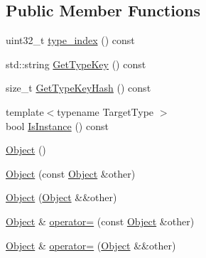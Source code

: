 \subsection*{Public Member Functions}
\begin{DoxyCompactItemize}
\item 
uint32\+\_\+t \hyperlink{classtvm_1_1runtime_1_1Object_a594c0d786dbc567ff6774ab11b45958a}{type\+\_\+index} () const 
\item 
std\+::string \hyperlink{classtvm_1_1runtime_1_1Object_a9581610ea91e0e38f57edc82e264a1b0}{Get\+Type\+Key} () const 
\item 
size\+\_\+t \hyperlink{classtvm_1_1runtime_1_1Object_ac9a7d8d3d562803c9cf91271c462b61d}{Get\+Type\+Key\+Hash} () const 
\item 
{\footnotesize template$<$typename Target\+Type $>$ }\\bool \hyperlink{classtvm_1_1runtime_1_1Object_af1359ebff2c328ff0bb80083937c95dd}{Is\+Instance} () const 
\item 
\hyperlink{classtvm_1_1runtime_1_1Object_a133436a9ec5c4a768b94102bf95a660b}{Object} ()
\item 
\hyperlink{classtvm_1_1runtime_1_1Object_ab7968feb6ad38ecaffc320e13819d826}{Object} (const \hyperlink{classtvm_1_1runtime_1_1Object}{Object} \&other)
\item 
\hyperlink{classtvm_1_1runtime_1_1Object_aa1612f69ea5b4225d4cda759cd517323}{Object} (\hyperlink{classtvm_1_1runtime_1_1Object}{Object} \&\&other)
\item 
\hyperlink{classtvm_1_1runtime_1_1Object}{Object} \& \hyperlink{classtvm_1_1runtime_1_1Object_a69c32fbd96181f5c21d2c878ab285e4f}{operator=} (const \hyperlink{classtvm_1_1runtime_1_1Object}{Object} \&other)
\item 
\hyperlink{classtvm_1_1runtime_1_1Object}{Object} \& \hyperlink{classtvm_1_1runtime_1_1Object_ae341e561272ff43cdcbc927bc29ac50d}{operator=} (\hyperlink{classtvm_1_1runtime_1_1Object}{Object} \&\&other)
\end{DoxyCompactItemize}
